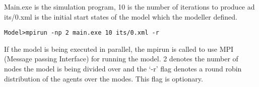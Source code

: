 Main.exe is the simulation program, 10 is the number of iterations to produce ad its/0.xml is the initial start states of the model which the modeller defined.

\begin{mylisting}
\begin{verbatim}
Model>mpirun -np 2 main.exe 10 its/0.xml -r
\end{verbatim}
\end{mylisting}

If the model is being executed in parallel, the mpirun is called to use MPI (Message passing Interface) for running the model. 2 denotes the number of nodes the model is being divided over and the `-r' flag denotes a round robin distribution of the agents over the modes. This flag is optionary.

